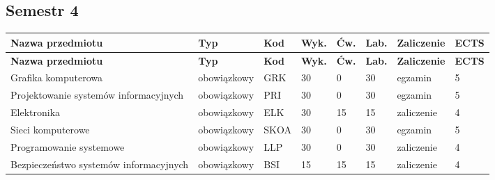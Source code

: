 \documentclass[12pt,a4paper]{article}
\newcommand{\thdrule}{\noalign{\global\setlength{\extrarowheight}{0pt}}}
\newcommand{\thdend}{\noalign{\global\setlength{\extrarowheight}{4pt}}}
\begin{document}
\subsection*{Semestr 4}

{\scriptsize
\begin{longtable}{m{5.0cm}m{1.9cm}m{0.75cm}m{0.85cm}m{0.85cm}m{0.85cm}m{1.45cm}m{0.9cm}}
\thdrule\toprule
\rowcolor{pjatkRed}
{\color{white}\footnotesize\textbf{\vphantom{Ag}Nazwa przedmiotu}} & {\color{white}\footnotesize\textbf{\vphantom{Ag}Typ}} & {\color{white}\footnotesize\textbf{\vphantom{Ag}Kod}} & {\color{white}\footnotesize\textbf{\vphantom{Ag}Wyk.}} & {\color{white}\footnotesize\textbf{\vphantom{Ag}Ćw.}} & {\color{white}\footnotesize\textbf{\vphantom{Ag}Lab.}} & {\color{white}\footnotesize\textbf{\vphantom{Ag}Zaliczenie}} & {\color{white}\footnotesize\textbf{\vphantom{Ag}ECTS}} \\
\midrule\thdend
\endfirsthead
\thdrule\toprule
\rowcolor{pjatkRed}
{\color{white}\footnotesize\textbf{\vphantom{Ag}Nazwa przedmiotu}} & {\color{white}\footnotesize\textbf{\vphantom{Ag}Typ}} & {\color{white}\footnotesize\textbf{\vphantom{Ag}Kod}} & {\color{white}\footnotesize\textbf{\vphantom{Ag}Wyk.}} & {\color{white}\footnotesize\textbf{\vphantom{Ag}Ćw.}} & {\color{white}\footnotesize\textbf{\vphantom{Ag}Lab.}} & {\color{white}\footnotesize\textbf{\vphantom{Ag}Zaliczenie}} & {\color{white}\footnotesize\textbf{\vphantom{Ag}ECTS}} \\
\midrule\thdend
\endhead
\rowcolor{tableRowLight} Grafika komputerowa & {\scriptsize obowiązkowy} & GRK & 30 & 0 & 30 & {\scriptsize egzamin} & 5 \\
\rowcolor{tableRowAlt} Projektowanie systemów informacyjnych & {\scriptsize obowiązkowy} & PRI & 30 & 0 & 30 & {\scriptsize egzamin} & 5 \\
\rowcolor{tableRowLight} Elektronika & {\scriptsize obowiązkowy} & ELK & 30 & 15 & 15 & {\scriptsize zaliczenie} & 4 \\
\rowcolor{tableRowAlt} Sieci komputerowe & {\scriptsize obowiązkowy} & SKOA & 30 & 0 & 30 & {\scriptsize egzamin} & 5 \\
\rowcolor{tableRowLight} Programowanie systemowe & {\scriptsize obowiązkowy} & LLP & 30 & 0 & 30 & {\scriptsize zaliczenie} & 4 \\
\rowcolor{tableRowAlt} Bezpieczeństwo systemów informacyjnych & {\scriptsize obowiązkowy} & BSI & 15 & 15 & 15 & {\scriptsize zaliczenie} & 4 \\

\end{longtable}}
\end{document}
